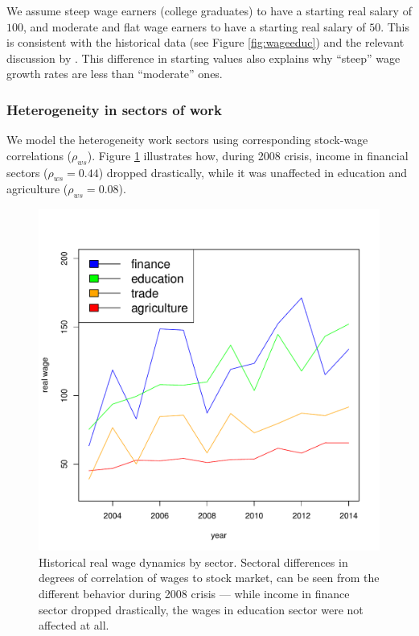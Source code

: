\documentclass[]{elsarticle}
\begin{document}
We assume steep wage earners (college graduates) to have a starting real salary of $100$, and moderate and flat wage earners to have a starting real salary of $50$. This is consistent with the historical data (see Figure \ref{fig:wageeduc}) and the relevant discussion by \citet{olear}. This difference in starting values also explains why ``steep'' wage growth rates are less than ``moderate'' ones.  

\subsubsection{Heterogeneity in sectors of work}

We model the heterogeneity work sectors using corresponding stock-wage correlations ($\rho_{ws}$). Figure \ref{fig:wagesec} illustrates how, during 2008 crisis, income in financial sectors ($\rho_{ws} = 0.44$) dropped drastically, while it was unaffected in education and agriculture ($\rho_{ws} = 0.08$).
\begin{figure}[h!]
	\centering
	\includegraphics[scale=0.4]{figs/wage2sec.pdf}
	\caption{Historical real wage dynamics by sector. Sectoral differences in degrees of correlation of wages to stock market, can be seen from the different behavior during 2008 crisis --- while income in finance sector dropped drastically, the wages in education sector were not affected at all.}
	\label{fig:wagesec}
\end{figure}
\end{document}
